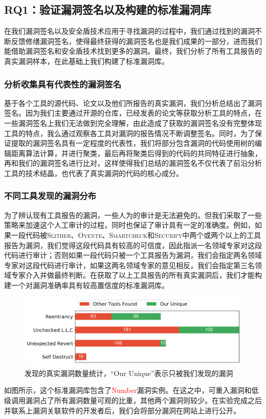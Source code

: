 \subsection{RQ1：验证漏洞签名以及构建的标准漏洞库}

在我们漏洞签名以及安全盾技术应用于寻找漏洞的过程中，我们通过找到的漏洞不断反馈修缮漏洞签名，使得最终获得的漏洞签名也是我们成果的一部分，进而我们能借助漏洞签名和安全盾技术找到更多的漏洞。最终，我们分析了所有工具报告的真实漏洞样本，在此基础上我们构建了标准漏洞库。

\subsubsection{分析收集具有代表性的漏洞签名}

基于各个工具的源代码、论文以及他们所报告的真实漏洞，我们分析总结出了漏洞签名。因为我们主要通过开源的仓库，已经发表的论文等获取分析工具的特点，在一些漏洞签名上我们无法做到完全理解，由此造成了获取的漏洞签名没有完整体现工具的特点，我么通过观察各工具对漏洞的报告情况不断调整签名。同时，为了保证提取的漏洞签名具有一定程度的代表性，我们将部分包含漏洞的代码使用树的编辑距离算法\cite{treeEditDistance}计算，并进行聚类，最后再将聚类后得到的代码的共同特征进行抽象，再和我们的漏洞签名进行比对，这样使得我们总结的漏洞签名不仅代表了前沿分析工具的技术结晶，也代表了真实漏洞的代码的核心成分。

\subsubsection{不同工具发现的漏洞分布}

为了辨认现有工具报告的漏洞，一些人为的审计是无法避免的。但我们采取了一些策略来加速这个人工审计的过程，同时也保证了审计具有一定的准确度。例如，如果一段代码被\textsc{Slither}、\textsc{Oyente}、\textsc{Smartcheck}和\textsc{Securify}中两个或两个以上的工具报告为漏洞，我们觉得这段代码具有较高的可信度，因此指派一名领域专家对这段代码进行审计；否则如果一段代码只被一个工具报告为漏洞，我们会指定两名领域专家对这段代码进行审计，如果这两名领域专家的意见相反，我们会指定第三名领域专家介入并做最终判断。在获取了以上工具报告的所有真实漏洞后，我们才能构建一个对漏洞准确率具有较高置信度的标准漏洞库。
\begin{figure}
  \centering
  \includegraphics[width=\linewidth]{figures/unique_tp.png}
  \caption{发现的真实漏洞数量统计，“Our Unique”表示只被我们发现的漏洞}\label{fig:unique_tp}
\end{figure}
如图所示，这个标准漏洞库包含了\textcolor{red}{Number}漏洞实例。在这之中，可重入漏洞和低级调用漏洞占了所有漏洞数量可观的比重，其他两个漏洞则较少。在实验完成之后并联系上漏洞关联软件的开发者后，我们会将部分漏洞在网站上进行公开。